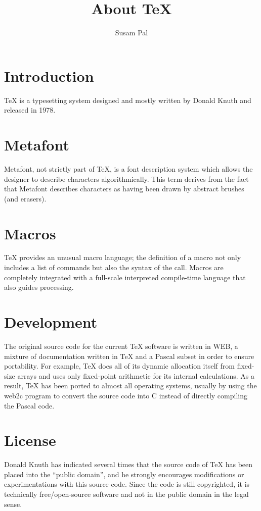 \documentclass[12pt]{article}
\author{Susam Pal}
\title{About \TeX}
\begin{document}
\maketitle
\tableofcontents
\section{Introduction}
\TeX{} is a typesetting system designed and mostly written by Donald
Knuth and released in 1978.

\section{Metafont}
Metafont, not strictly part of \TeX{}, is a font description system
which allows the designer to describe characters algorithmically. This
term derives from the fact that Metafont describes characters as having
been drawn by abstract brushes (and erasers).

\section{Macros}
\TeX{} provides an unusual macro language; the definition of a macro not
only includes a list of commands but also the syntax of the call. Macros
are completely integrated with a full-scale interpreted compile-time
language that also guides processing.

\section{Development}
The original source code for the current \TeX{} software is written in
WEB, a mixture of documentation written in \TeX{} and a Pascal subset in
order to ensure portability. For example, \TeX{} does all of its dynamic
allocation itself from fixed-size arrays and uses only fixed-point
arithmetic for its internal calculations. As a result, \TeX{} has been
ported to almost all operating systems, usually by using the web2c
program to convert the source code into C instead of directly compiling
the Pascal code.

\section{License}
Donald Knuth has indicated several times that the source code of TeX has
been placed into the ``public domain'', and he strongly encourages
modifications or experimentations with this source code. Since the code
is still copyrighted, it is technically free/open-source software and
not in the public domain in the legal sense.
\end{document}
